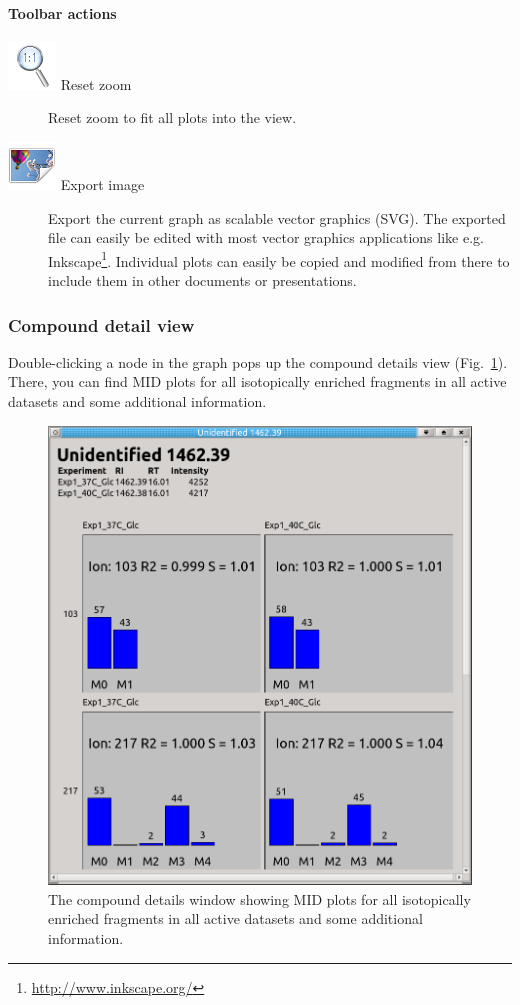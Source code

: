 \documentclass[a4paper,12pt]{scrartcl}
\begin{document}
\paragraph{Toolbar actions}
\begin{description}
\item[\includegraphics{gfx/ico_zoom-original.png} Reset zoom]
Reset zoom to fit all plots into the view.


\item[\includegraphics{gfx/ico_export-image.png} Export image]
Export the current graph as scalable vector graphics (SVG). The exported file can easily be edited with most vector graphics applications like e.g. Inkscape\footnote{\url{http://www.inkscape.org/}}. Individual plots can easily be copied and modified from there to include them in other documents or presentations.
\end{description}

\subsubsection{Compound detail view}
\label{sec:compound-details}

Double-clicking a node in the graph pops up the compound details view (Fig.~\ref{fig:compound-details}). There, you can find MID plots for all isotopically enriched fragments in all active datasets and some additional information.

\begin{figure}[htb]
 \centering
 \includegraphics[width=0.6\linewidth]{./gfx/ss_compound_details.png}
 \caption{The compound details window showing MID plots for all isotopically enriched fragments in all active datasets and some additional information.}
 \label{fig:compound-details}
\end{figure}
\end{document}

